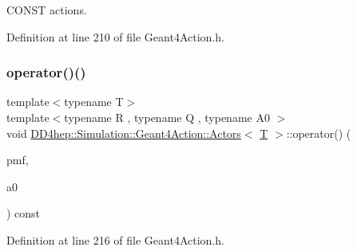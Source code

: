 C\+O\+N\+ST actions. 



Definition at line 210 of file Geant4\+Action.\+h.

\hypertarget{class_d_d4hep_1_1_simulation_1_1_geant4_action_1_1_actors_af26cd9a0b6f118db6ccebe32512bb121}{}\label{class_d_d4hep_1_1_simulation_1_1_geant4_action_1_1_actors_af26cd9a0b6f118db6ccebe32512bb121} 
\subsubsection{\texorpdfstring{operator()()}{operator()()}\hspace{0.1cm}{\footnotesize\ttfamily [5/6]}}
{\footnotesize\ttfamily template$<$typename T$>$ \\
template$<$typename R , typename Q , typename A0 $>$ \\
void \hyperlink{class_d_d4hep_1_1_simulation_1_1_geant4_action_1_1_actors}{D\+D4hep\+::\+Simulation\+::\+Geant4\+Action\+::\+Actors}$<$ \hyperlink{class_t}{T} $>$\+::operator() (\begin{DoxyParamCaption}\item[{R(Q\+::$\ast$)(A0) const}]{pmf,  }\item[{A0}]{a0 }\end{DoxyParamCaption}) const\hspace{0.3cm}{\ttfamily [inline]}}



Definition at line 216 of file Geant4\+Action.\+h.

\hypertarget{class_d_d4hep_1_1_simulation_1_1_geant4_action_1_1_actors_add8decfc0e37bc4b84f8b86da56e5e19}{}\label{class_d_d4hep_1_1_simulation_1_1_geant4_action_1_1_actors_add8decfc0e37bc4b84f8b86da56e5e19} 

